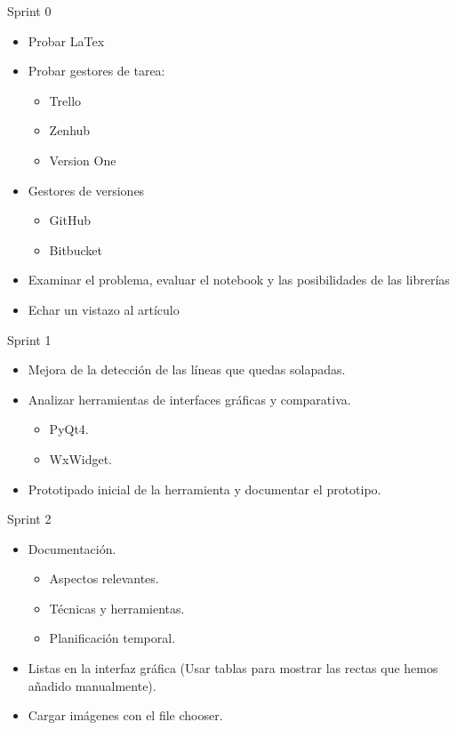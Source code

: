Sprint 0
\begin{itemize}
	\item Probar LaTex 
	\item Probar gestores de tarea: 
	\begin{itemize}
	\item Trello 
	\item Zenhub 
	\item Version One
	\end{itemize}
	\item Gestores de versiones 
	\begin{itemize}
	\item GitHub 
	\item Bitbucket 
	\end{itemize}
	\item Examinar el problema, evaluar el notebook y las posibilidades de las librerías \\
	\item Echar un vistazo al artículo 
\end{itemize}



Sprint 1 
\begin{itemize}
\item Mejora de la detección de las líneas que quedas solapadas. 
\item Analizar herramientas de interfaces gráficas y comparativa.
	\begin{itemize}
	\item PyQt4. 
	\item WxWidget.
	\end{itemize}
\item Prototipado inicial de la herramienta y documentar el prototipo.
\end{itemize}



Sprint 2 
\begin{itemize}
\item Documentación. 
\begin{itemize}
	\item Aspectos relevantes. 
	\item Técnicas y herramientas.
	\item Planificación temporal.
	\end{itemize}
\item Listas en la interfaz gráfica (Usar tablas para mostrar las rectas que hemos añadido manualmente).
\item Cargar imágenes con el file chooser.
\end{itemize}

